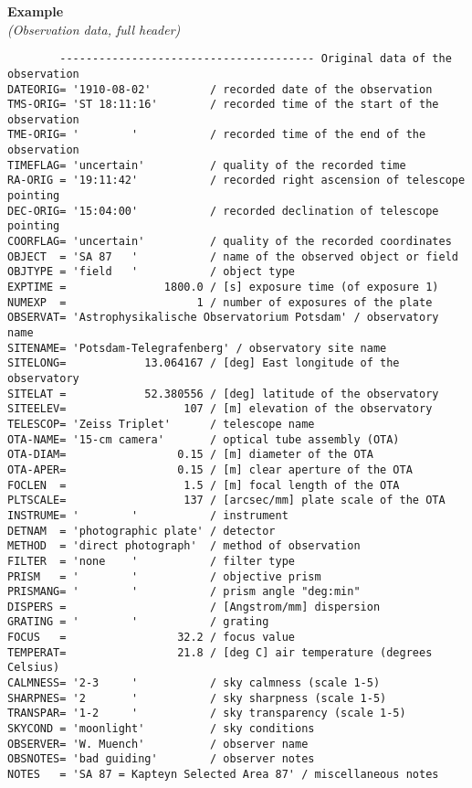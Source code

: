 \documentclass[11pt]{ivoa}
\newenvironment{fitsexample}[1]
{\bigskip\noindent\textbf{Example}\\\textit{(#1)\smallskip}}
{\medskip}
\begin{document}
\begin{fitsexample}{Observation data, full header}
\begin{lstlisting}
        --------------------------------------- Original data of the observation
DATEORIG= '1910-08-02'         / recorded date of the observation
TMS-ORIG= 'ST 18:11:16'        / recorded time of the start of the observation
TME-ORIG= '        '           / recorded time of the end of the observation
TIMEFLAG= 'uncertain'          / quality of the recorded time
RA-ORIG = '19:11:42'           / recorded right ascension of telescope pointing
DEC-ORIG= '15:04:00'           / recorded declination of telescope pointing
COORFLAG= 'uncertain'          / quality of the recorded coordinates
OBJECT  = 'SA 87   '           / name of the observed object or field
OBJTYPE = 'field   '           / object type
EXPTIME =               1800.0 / [s] exposure time (of exposure 1)
NUMEXP  =                    1 / number of exposures of the plate
OBSERVAT= 'Astrophysikalische Observatorium Potsdam' / observatory name
SITENAME= 'Potsdam-Telegrafenberg' / observatory site name
SITELONG=            13.064167 / [deg] East longitude of the observatory
SITELAT =            52.380556 / [deg] latitude of the observatory
SITEELEV=                  107 / [m] elevation of the observatory
TELESCOP= 'Zeiss Triplet'      / telescope name
OTA-NAME= '15-cm camera'       / optical tube assembly (OTA)
OTA-DIAM=                 0.15 / [m] diameter of the OTA
OTA-APER=                 0.15 / [m] clear aperture of the OTA
FOCLEN  =                  1.5 / [m] focal length of the OTA
PLTSCALE=                  137 / [arcsec/mm] plate scale of the OTA
INSTRUME= '        '           / instrument
DETNAM  = 'photographic plate' / detector
METHOD  = 'direct photograph'  / method of observation
FILTER  = 'none    '           / filter type
PRISM   = '        '           / objective prism
PRISMANG= '        '           / prism angle "deg:min"
DISPERS =                      / [Angstrom/mm] dispersion
GRATING = '        '           / grating
FOCUS   =                 32.2 / focus value
TEMPERAT=                 21.8 / [deg C] air temperature (degrees Celsius)
CALMNESS= '2-3     '           / sky calmness (scale 1-5)
SHARPNES= '2       '           / sky sharpness (scale 1-5)
TRANSPAR= '1-2     '           / sky transparency (scale 1-5)
SKYCOND = 'moonlight'          / sky conditions
OBSERVER= 'W. Muench'          / observer name
OBSNOTES= 'bad guiding'        / observer notes
NOTES   = 'SA 87 = Kapteyn Selected Area 87' / miscellaneous notes
\end{lstlisting}
\end{fitsexample}
\end{document}
